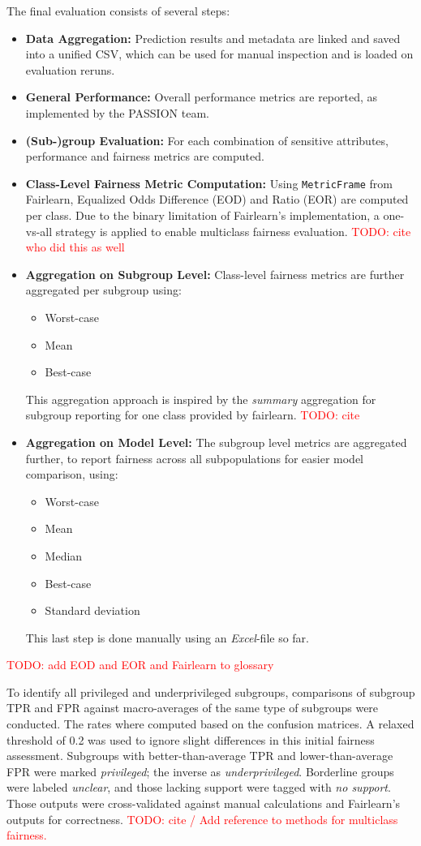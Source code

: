\documentclass[12pt, a4paper, oneside]{book}   	%
\renewcommand{\todo}[1]{\textcolor{red}{TODO: #1}}
\begin{document}
		The final evaluation consists of several steps:
		\begin{itemize}
			\item \textbf{Data Aggregation:} Prediction results and metadata are linked and saved into a unified CSV, which can be used for manual inspection and is loaded on evaluation reruns.
			\item \textbf{General Performance:} Overall performance metrics are reported, as implemented by the PASSION team.
			\item \textbf{(Sub-)group Evaluation:} For each combination of sensitive attributes, performance and fairness metrics are computed.
			\item \textbf{Class-Level Fairness Metric Computation:} Using \texttt{MetricFrame} from Fairlearn, Equalized Odds Difference (EOD) and Ratio (EOR) are computed per class. Due to the binary limitation of Fairlearn's implementation, a one-vs-all strategy is applied to enable multiclass fairness evaluation. \todo{cite who did this as well}
			\item \textbf{Aggregation on Subgroup Level:} Class-level fairness metrics are further aggregated per subgroup using:
			\begin{itemize}
				\item Worst-case
				\item Mean
				\item Best-case
			\end{itemize}
			This aggregation approach is inspired by the \textit{summary} aggregation for subgroup reporting for one class provided by fairlearn. \todo{cite}
			\item \textbf{Aggregation on Model Level:} The subgroup level metrics are aggregated further, to report fairness across all subpopulations for easier model comparison, using:
			\begin{itemize}
				\item Worst-case
				\item Mean
				\item Median
				\item Best-case
				\item Standard deviation
			\end{itemize}
			This last step is done manually using an \textit{Excel}-file so far.
		\end{itemize}
		\todo{add EOD and EOR and Fairlearn to glossary}
		
		To identify all privileged and underprivileged subgroups, comparisons of subgroup \gls{TPR} and \gls{FPR} against macro-averages of the same type of subgroups were conducted. The rates where computed based on the confusion matrices. A relaxed threshold of 0.2 was used to ignore slight differences in this initial fairness assessment. Subgroups with better-than-average \gls{TPR} and lower-than-average \gls{FPR} were marked \textit{privileged}; the inverse as \textit{underprivileged}. Borderline groups were labeled \textit{unclear}, and those lacking support were tagged with \textit{no support}. Those outputs were cross-validated against manual calculations and Fairlearn's outputs for correctness. \todo{cite / Add reference to methods for multiclass fairness.}
		
\end{document}
